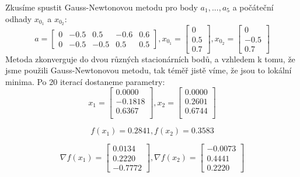 \documentclass[11pt]{article}
\begin{document}
Zkusíme spustit Gauss-Newtonovou metodu pro body $a_{1},...,a_{5}$ a počáteční odhady $x_{0_{1}}$ a $x_{0_{2}}$:
$$a = 
\begin{bmatrix}
0 & -0.5 & 0.5 & -0.6 & 0.6\\
0 & -0.5 &-0.5 & 0.5 & 0.5
\end{bmatrix}, 
x_{0_{1}} = 
\begin{bmatrix}
0\\
0.5\\
0.7
\end{bmatrix},
x_{0_{2}} = 
\begin{bmatrix}
0\\
-0.5\\
0.7
\end{bmatrix}
$$
Metoda zkonverguje do dvou různých stacionárních bodů, a vzhledem k tomu, že jsme použili Gauss-Newtonovou metodu, tak téměř jistě víme, že jsou to lokální minima. Po 20 iterací dostaneme parametry: 
$$x_{1} = 
\begin{bmatrix}
0.0000\\
-0.1818\\
0.6367\\
\end{bmatrix},
x_{2} = 
\begin{bmatrix}
0.0000\\
0.2601\\
0.6744\\
\end{bmatrix}
$$

$$ f(x_{1}) = 0.2841, f(x_{2}) = 0.3583$$

$$ \nabla f(x_{1}) =
\begin{bmatrix}
0.0134\\
0.2220\\
-0.7772
\end{bmatrix},
\nabla f(x_{2}) = 
\begin{bmatrix}
-0.0073\\
0.4441\\
0.2220
\end{bmatrix}$$
\end{document}

